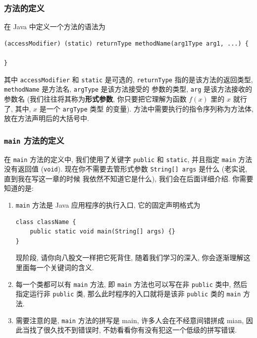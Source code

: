 \documentclass[10pt,UTF8]{book} %
\begin{document}
\subsubsection{方法的定义}

在 Java 中定义一个方法的语法为
\begin{lstlisting}
(accessModifier) (static) returnType methodName(arg1Type arg1, ...) {

}
\end{lstlisting}
其中 \lstinline|accessModifier| 和 \lstinline|static| 是可选的, 
\lstinline|returnType| 指的是该方法的返回类型, 
\lstinline|methodName| 是方法名,
\lstinline|argType| 是该方法接受的
参数的类型, \lstinline|arg| 是该方法接收的参数名 (我们往往将其称为\textbf{形式参数}, 
你只要把它理解为函数 $f(x)$ 里的 $x$ 就行了, 其中, $x$ 是一个 \lstinline|argType| 类型
的变量). 方法中需要执行的指令序列称为方法体, 放在方法声明后的大括号中.

\subsubsection{\lstinline|main| 方法的定义}

在 \lstinline|main| 方法的定义中, 我们使用了关键字 \lstinline|public| 
和 \lstinline|static|, 并且指定 \lstinline|main| 方法没有返回值 (\lstinline|void|).
现在你不需要去管形式参数 \lstinline|String[] args| 是什么 (老实说, 直到我在写这一章的时候
我依然不知道它是什么), 我们会在后面详细介绍.
你需要知道的是:
\begin{enumerate}
    \item \lstinline|main| 方法是 Java 应用程序的执行入口, 它的固定声明格式为
    \begin{lstlisting}
class className {
    public static void main(String[] args) {}
}
    \end{lstlisting}
    现阶段, 请你向八股文一样把它死背住, 随着我们学习的深入, 你会逐渐理解这里面每一个关键词的含义.
    
    \item 每一个类都可以有 \lstinline|main| 方法,
    即 \lstinline|main| 方法也可以写在非 \lstinline|public| 类中, 然后指定运行非
    \lstinline|public| 类, 那么此时程序的入口就将是该非 \lstinline|public| 
    类的 \lstinline|main| 方法.
    
    \item 需要注意的是, \lstinline|main| 方法的拼写是 main, 许多人会在不经意间错拼成 mian,
    因此当找了很久找不到错误时, 不妨看看你有没有犯这一个低级的拼写错误.
\end{enumerate}
\end{document}
